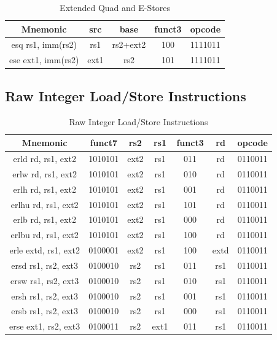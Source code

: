 \documentclass{article}
\begin{document}
\begin{center}
\begin{small}
\begin{table}[H]
\caption{Extended Quad and E-Stores}
\begin{center}
\begin{tabular}{| c | c | c | c | c | }
\hline
Mnemonic & src & base & funct3 & opcode \\ \hline
\hline
esq rs1, imm(rs2) & rs1 & rs2+ext2 & 100 & 1111011\\
\hline
ese ext1, imm(rs2) & ext1 & rs2 & 101 & 1111011\\
\hline
\end{tabular}
\end{center}
\end{table}

\end{small}
\end{center}

\newpage
\subsection{Raw Integer Load/Store Instructions}

\begin{center}
\begin{small}

\begin{table}[H]
\caption{Raw Integer Load/Store Instructions}
\begin{center}
\begin{tabular}{| c | c | c | c | c | c | c |}
\hline
Mnemonic & funct7 & rs2 & rs1 & funct3 & rd & opcode \\ \hline
\hline
erld rd, rs1, ext2 & 1010101 & ext2 & rs1 & 011 & rd & 0110011\\
\hline
erlw rd, rs1, ext2 & 1010101 & ext2 & rs1 & 010 & rd & 0110011\\
\hline
erlh rd, rs1, ext2 & 1010101 & ext2 & rs1 & 001 & rd & 0110011\\
\hline
erlhu rd, rs1, ext2 & 1010101 & ext2 & rs1 & 101 & rd & 0110011\\
\hline
erlb rd, rs1, ext2 & 1010101 & ext2 & rs1 & 000 & rd & 0110011\\
\hline
erlbu rd, rs1, ext2 & 1010101 & ext2 & rs1 & 100 & rd & 0110011\\
\hline
erle extd, rs1, ext2 & 0100001 & ext2 & rs1 & 100 & extd & 0110011\\
\hline
ersd rs1, rs2, ext3 & 0100010 &  rs2 & rs1 & 011 & rs1 & 0110011\\
\hline
ersw rs1, rs2, ext3 & 0100010 &  rs2 & rs1 & 010 & rs1 & 0110011\\
\hline
ersh rs1, rs2, ext3 & 0100010 &  rs2 & rs1 & 001 & rs1 & 0110011\\
\hline
ersb rs1, rs2, ext3 & 0100010 &  rs2 & rs1 & 000 & rs1 & 0110011\\
\hline
erse ext1, rs2, ext3 & 0100011 &  rs2 & ext1 & 011 & rs1 & 0110011\\
\hline
\end{tabular}
\end{center}
\end{table}

\end{small}
\end{center}
\end{document}
